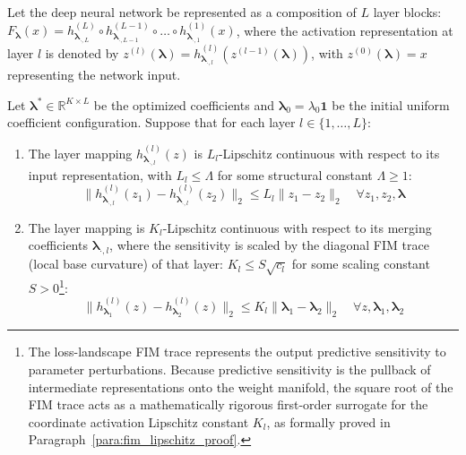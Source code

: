 Let the deep neural network be represented as a composition of $L$ layer blocks: $F_{\boldsymbol{\lambda}}(x) = h^{(L)}_{\boldsymbol{\lambda}_{\cdot, L}} \circ h^{(L-1)}_{\boldsymbol{\lambda}_{\cdot, L-1}} \circ \dots \circ h^{(1)}_{\boldsymbol{\lambda}_{\cdot, 1}}(x)$, where the activation representation at layer $l$ is denoted by $z^{(l)}(\boldsymbol{\lambda}) = h^{(l)}_{\boldsymbol{\lambda}_{\cdot, l}}(z^{(l-1)}(\boldsymbol{\lambda}))$, with $z^{(0)}(\boldsymbol{\lambda}) = x$ representing the network input. 

\begin{theorem}
\label{thm:representation_drift}
Let $\boldsymbol{\lambda}^* \in \mathbb{R}^{K \times L}$ be the optimized coefficients and $\boldsymbol{\lambda}_0 = \lambda_0 \mathbf{1}$ be the initial uniform coefficient configuration. Suppose that for each layer $l \in \{1, \dots, L\}$:
\begin{enumerate}
    \item The layer mapping $h^{(l)}_{\boldsymbol{\lambda}_{\cdot, l}}(z)$ is $L_l$-Lipschitz continuous with respect to its input representation, with $L_l \le \Lambda$ for some structural constant $\Lambda \ge 1$:
    \begin{equation}
    \|h^{(l)}_{\boldsymbol{\lambda}_{\cdot, l}}(z_1) - h^{(l)}_{\boldsymbol{\lambda}_{\cdot, l}}(z_2)\|_2 \le L_l \|z_1 - z_2\|_2 \quad \forall z_1, z_2, \boldsymbol{\lambda}
    \end{equation}
    \item The layer mapping is $K_l$-Lipschitz continuous with respect to its merging coefficients $\boldsymbol{\lambda}_{\cdot, l}$, where the sensitivity is scaled by the diagonal FIM trace (local base curvature) of that layer: $K_l \le S \sqrt{c_l}$ for some scaling constant $S > 0$\footnote{The loss-landscape FIM trace represents the output predictive sensitivity to parameter perturbations. Because predictive sensitivity is the pullback of intermediate representations onto the weight manifold, the square root of the FIM trace acts as a mathematically rigorous first-order surrogate for the coordinate activation Lipschitz constant $K_l$, as formally proved in Paragraph~\ref{para:fim_lipschitz_proof}.}:
    \begin{equation}
    \|h^{(l)}_{\boldsymbol{\lambda}_1}(z) - h^{(l)}_{\boldsymbol{\lambda}_2}(z)\|_2 \le K_l \|\boldsymbol{\lambda}_1 - \boldsymbol{\lambda}_2\|_2 \quad \forall z, \boldsymbol{\lambda}_1, \boldsymbol{\lambda}_2
    \end{equation}

\end{enumerate}
\end{theorem}
